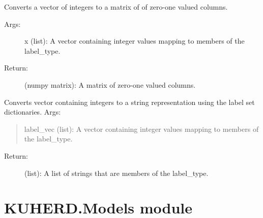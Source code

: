\documentclass[letterpaper,10pt,english]{sphinxmanual}
\begin{document}
\begin{fulllineitems}
\begin{fulllineitems}
\label{\detokenize{KUHERD:KUHERD.LabelTransformer.LabelTransformer.vec2mat}}
Converts a vector of integers to a matrix of of zero-one valued columns.
\begin{description}
\item[{Args:}] \leavevmode
x (list): A vector containing integer values mapping to members of the label\_type.

\item[{Return:}] \leavevmode
(numpy matrix): A matrix of zero-one valued columns.

\end{description}

\end{fulllineitems}


\begin{fulllineitems}
\label{\detokenize{KUHERD:KUHERD.LabelTransformer.LabelTransformer.vec2string}}
Converts vector containing integers to a string representation using the label set dictionaries.
Args:
\begin{quote}

label\_vec (list): A vector containing integer values mapping to members of the label\_type.
\end{quote}
\begin{description}
\item[{Return:}] \leavevmode
(list): A list of strings that are members of the label\_type.

\end{description}

\end{fulllineitems}


\end{fulllineitems}



\section{KUHERD.Models module}
\label{\detokenize{KUHERD:kuherd-models-module}}\label{\detokenize{KUHERD:module-KUHERD.Models}}
\end{document}
